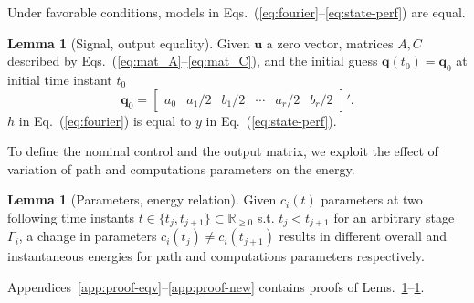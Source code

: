 \documentclass[letterpaper,10pt,journal,twoside]{IEEEtran}
\theoremstyle{definition}
\newtheorem{lem}[thm]{Lemma}
\begin{document}

Under favorable conditions, %
models in Eqs.~(\ref{eq:fourier}--\ref{eq:state-perf}) are equal.

\begin{lem}[Signal, output equality]\label{lem:eqv}Given $\mathbf{u}$ a zero vector, matrices $A,C$ described by Eqs.~(\ref{eq:mat_A}--\ref{eq:mat_C}), and the initial guess $\mathbf{q}(t_0)=\mathbf{q}_0$ at initial time instant $t_0$
  \begin{equation*}
  \mathbf{q}_0=\begin{bmatrix}a_0 & a_1/2 & b_1/2 & \cdots & a_r/2 & b_r/2\end{bmatrix}'.
  \end{equation*} 
  $h$ in Eq.~(\ref{eq:fourier}) is equal to $y$ in Eq.~(\ref{eq:state-perf}).
\end{lem}

To define the nominal control and the output matrix, we exploit the effect of variation of path and computations parameters on the energy. 

\begin{lem}[Parameters, energy relation]\label{lem:new}
  Given $c_i(t)$ parameters at two following time instants $t\in\{t_j,t_{j+1}\}\subset\mathbb{R}_{\geq 0}$ s.t. $t_j<t_{j+1}$ for an arbitrary stage $\Gamma_i$, a change in parameters $c_i(t_j)\neq c_i(t_{j+1})$ results in different overall and instantaneous energies for path and computations parameters respectively.
\end{lem}

Appendices~\ref{app:proof-eqv}--\ref{app:proof-new} contains proofs of Lems.~\ref{lem:eqv}--\ref{lem:new}.
\end{document}

